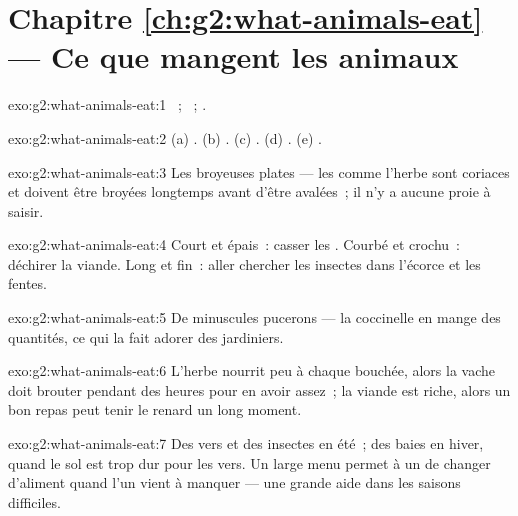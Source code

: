\section*{Chapitre \ref{ch:g2:what-animals-eat} --- Ce que mangent les animaux}

\begin{solution}{exo:g2:what-animals-eat:1}
~; ~; .
\end{solution}

\begin{solution}{exo:g2:what-animals-eat:2}
(a) . (b) . (c) . (d) . (e)
.
\end{solution}

\begin{solution}{exo:g2:what-animals-eat:3}
Les broyeuses plates --- les  comme l'herbe sont coriaces et
doivent être broyées longtemps avant d'être avalées~; il n'y a
aucune proie à saisir.
\end{solution}

\begin{solution}{exo:g2:what-animals-eat:4}
Court et épais~: casser les . Courbé et crochu~: déchirer la
viande. Long et fin~: aller chercher les insectes dans l'écorce et
les fentes.
\end{solution}

\begin{solution}{exo:g2:what-animals-eat:5}
De minuscules pucerons --- la coccinelle en mange des quantités, ce
qui la fait adorer des jardiniers.
\end{solution}

\begin{solution}{exo:g2:what-animals-eat:6}
L'herbe nourrit peu à chaque bouchée, alors la vache doit brouter
pendant des heures pour en avoir assez~; la viande est riche, alors
un bon repas peut tenir le renard un long moment.
\end{solution}

\begin{solution}{exo:g2:what-animals-eat:7}
Des vers et des insectes en été~; des baies en hiver, quand le sol
est trop dur pour les vers. Un large menu permet à un  de
changer d'aliment quand l'un vient à manquer --- une grande aide
dans les saisons difficiles.
\end{solution}

